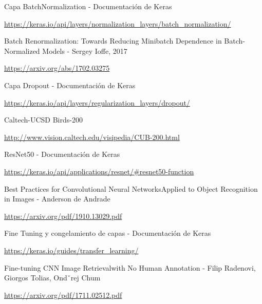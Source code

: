 \documentclass[12pt, spanish]{article}
\begin{document}
\begin{thebibliography}{9}

	Capa BatchNormalization - Documentación de Keras

	\url{https://keras.io/api/layers/normalization_layers/batch_normalization/}



	Batch Renormalization: Towards Reducing Minibatch Dependence in Batch-Normalized Models - Sergey Ioffe, 2017

	\url{https://arxiv.org/abs/1702.03275}



	Capa Dropout - Documentación de Keras

	\url{https://keras.io/api/layers/regularization_layers/dropout/}



	Caltech-UCSD Birds-200

	\url{http://www.vision.caltech.edu/visipedia/CUB-200.html}


	ResNet50 - Documentación de Keras

	\url{https://keras.io/api/applications/resnet/#resnet50-function}



	Best Practices for Convolutional Neural NetworksApplied to Object Recognition in Images - Anderson de Andrade

	\url{https://arxiv.org/pdf/1910.13029.pdf}



	Fine Tuning y congelamiento de capas - Documentación de Keras

	\url{https://keras.io/guides/transfer_learning/}



	Fine-tuning CNN Image Retrievalwith No Human Annotation - Filip Radenovi, Giorgos Tolias, Ondˇrej Chum

	\url{https://arxiv.org/pdf/1711.02512.pdf}

\end{thebibliography}
\end{document}
